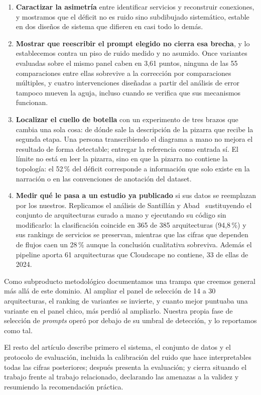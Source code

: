 \documentclass[a4paper, twocolumn, 10pt]{IEEEtran}
\begin{document}
\begin{enumerate}\itemsep3pt
\item \textbf{Caractizar la asimetría} entre identificar servicios y
reconstruir conexiones, y mostramos que el déficit no es ruido sino subdibujado
sistemático, estable en dos diseños de sistema que difieren en casi todo lo
demás.
\item \textbf{Mostrar que reescribir el prompt elegido no cierra esa brecha}, y
lo establecemos contra un piso de ruido medido y no asumido. Once variantes
evaluadas sobre el mismo panel caben en 3,61 puntos, ninguna de las 55
comparaciones entre ellas sobrevive a la corrección por comparaciones múltiples,
y cuatro intervenciones diseñadas a partir del análisis de error tampoco mueven
la aguja, incluso cuando se verifica que sus mecanismos funcionan.
\item \textbf{Localizar el cuello de botella} con un experimento de tres brazos
que cambia una sola cosa: de dónde sale la descripción de la pizarra que recibe
la segunda etapa. Una persona transcribiendo el diagrama a mano no mejora el
resultado de forma detectable; entregar la referencia como entrada sí. El límite
no está en leer la pizarra, sino en que la pizarra no contiene la topología: el
52\,\% del déficit corresponde a información que solo existe en la narración o en
las convenciones de anotación del dataset.
\item \textbf{Medir qué le pasa a un estudio ya publicado} si sus datos se
reemplazan por los nuestros. Replicamos el análisis de Santillán y
Abad~\cite{santillan2025hpc} sustituyendo el conjunto de arquitecturas curado a mano y ejecutando su
código sin modificarlo: la clasificación coincide en 365 de 385 arquitecturas
(94,8\,\%) y sus rankings de servicios se preservan, mientras que las cifras que
dependen de flujos caen un 28\,\% aunque la conclusión cualitativa sobreviva.
Además el pipeline aporta 61 arquitecturas que Cloudscape no contiene, 33 de
ellas de 2024.
\end{enumerate}
 
Como subproducto metodológico documentamos una trampa que creemos general más
allá de este dominio. Al ampliar el panel de selección de 14 a 30 arquitecturas,
el ranking de variantes se invierte, y cuanto mejor puntuaba una variante en el
panel chico, más perdió al ampliarlo. Nuestra propia fase de selección de
\emph{prompts} operó por debajo de su umbral de detección, y lo reportamos como
tal.
 
El resto del artículo describe primero el sistema, el conjunto de datos y el protocolo de
evaluación, incluida la calibración del ruido que hace interpretables todas las
cifras posteriores; después presenta la evaluación; y cierra situando el trabajo
frente al trabajo relacionado, declarando las amenazas a la validez y resumiendo
la recomendación práctica.
 
\end{document}
